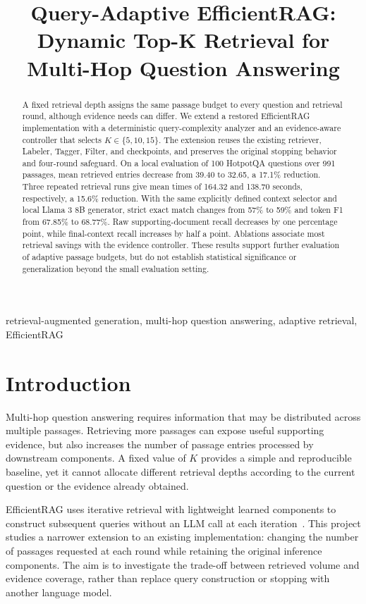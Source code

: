 \documentclass[conference]{IEEEtran}
\title{Query-Adaptive EfficientRAG: Dynamic Top-K Retrieval for Multi-Hop Question Answering}
\author{\IEEEauthorblockN{Awnish Kumar}\IEEEauthorblockA{Student ID: 202451188\\Indian Institute of Information Technology Vadodara}}
\begin{document}
\maketitle
\begin{abstract}
A fixed retrieval depth assigns the same passage budget to every question and retrieval round, although evidence needs can differ. We extend a restored EfficientRAG implementation with a deterministic query-complexity analyzer and an evidence-aware controller that selects $K\in\{5,10,15\}$. The extension reuses the existing retriever, Labeler, Tagger, Filter, and checkpoints, and preserves the original stopping behavior and four-round safeguard. On a local evaluation of 100 HotpotQA questions over 991 passages, mean retrieved entries decrease from 39.40 to 32.65, a 17.1\% reduction. Three repeated retrieval runs give mean times of 164.32 and 138.70 seconds, respectively, a 15.6\% reduction. With the same explicitly defined context selector and local Llama 3 8B generator, strict exact match changes from 57\% to 59\% and token F1 from 67.85\% to 68.77\%. Raw supporting-document recall decreases by one percentage point, while final-context recall increases by half a point. Ablations associate most retrieval savings with the evidence controller. These results support further evaluation of adaptive passage budgets, but do not establish statistical significance or generalization beyond the small evaluation setting.
\end{abstract}
\begin{IEEEkeywords}
retrieval-augmented generation, multi-hop question answering, adaptive retrieval, EfficientRAG
\end{IEEEkeywords}

\section{Introduction}
Multi-hop question answering requires information that may be distributed across multiple passages. Retrieving more passages can expose useful supporting evidence, but also increases the number of passage entries processed by downstream components. A fixed value of $K$ provides a simple and reproducible baseline, yet it cannot allocate different retrieval depths according to the current question or the evidence already obtained.

EfficientRAG uses iterative retrieval with lightweight learned components to construct subsequent queries without an LLM call at each iteration~\cite{efficientrag}. This project studies a narrower extension to an existing implementation: changing the number of passages requested at each round while retaining the original inference components. The aim is to investigate the trade-off between retrieved volume and evidence coverage, rather than replace query construction or stopping with another language model.
\end{document}
